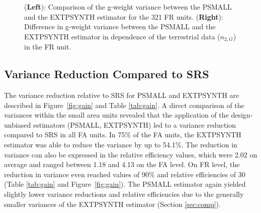 \documentclass[remotesensing,article,accept,moreauthors,pdftex,10pt,a4paper]{Definitions/mdpi}
\newcommand{\psmall}{PSMALL}
\newcommand{\extpsynth}{EXTPSYNTH}
\begin{document}
\begin{figure}[H]
	\centering
	\caption{({\textbf{Left}}): Comparison of the g-weight variance between the PSMALL and the EXTPSYNTH estimator for the 321 FR units.
		({\textbf{Right}}): Difference in g-weight variance between the PSMALL and the EXTPSYNTH estimator in dependence of the terrestrial data ($n_{2,G}$) in the FR unit.}
	\label{fig:compvar}
\end{figure}




\subsection{Variance Reduction Compared to SRS}
\label{sec:gain_eval}

The variance reduction relative to SRS for \psmall{} and \extpsynth{} are described in Figure~\ref{fig:gain} and Table \ref{tab:gain}. A direct comparison of the variances within the small area units revealed that the application of the design-unbiased estimators (\psmall{}, \extpsynth{}) led to a variance reduction compared to SRS in all FA units. In 75\% of the FA units, the \extpsynth{} estimator was able to reduce the variance by up to 54.1\%. The reduction in variance can also be expressed in the relative efficiency values, which were 2.02 on average and ranged between 1.18 and 4.13 on the FA level. On FR level, the reduction in variance even reached values of 90\% and relative efficiencies of 30 (Table \ref{tab:gain} and Figure~\ref{fig:gain}). The \psmall{} estimator again yielded slightly lower variance reductions and relative efficiencies due to the generally smaller variances of the \extpsynth{} estimator (Section \ref{sec:comp}).
\end{document}
